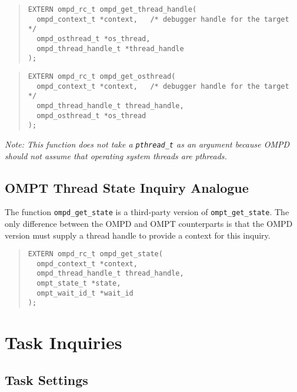 \documentclass{article}
\begin{document}
\begin{quote}
\begin{verbatim}
EXTERN ompd_rc_t ompd_get_thread_handle(
  ompd_context_t *context,   /* debugger handle for the target */
  ompd_osthread_t *os_thread, 
  ompd_thread_handle_t *thread_handle
);
\end{verbatim}
\end{quote}

\begin{quote}
\begin{verbatim}
EXTERN ompd_rc_t ompd_get_osthread(
  ompd_context_t *context,   /* debugger handle for the target */
  ompd_thread_handle_t thread_handle,
  ompd_osthread_t *os_thread
);
\end{verbatim}
\end{quote}


\noindent
{\em Note: This function does not take a \verb|pthread_t| as an argument because OMPD should not assume that operating system threads are pthreads. }





\subsection{OMPT Thread State Inquiry Analogue}

The function \verb|ompd_get_state| is a  third-party version of \verb|ompt_get_state|. 
The only difference between the OMPD and OMPT counterparts is that the OMPD version must supply a thread handle to provide a context for this inquiry.

\begin{quote}
\begin{verbatim}
EXTERN ompd_rc_t ompd_get_state(
  ompd_context_t *context,
  ompd_thread_handle_t thread_handle, 
  ompt_state_t *state, 
  ompt_wait_id_t *wait_id
);
\end{verbatim}
\end{quote}



\section{Task Inquiries}


\subsection{Task Settings}
\end{document}

